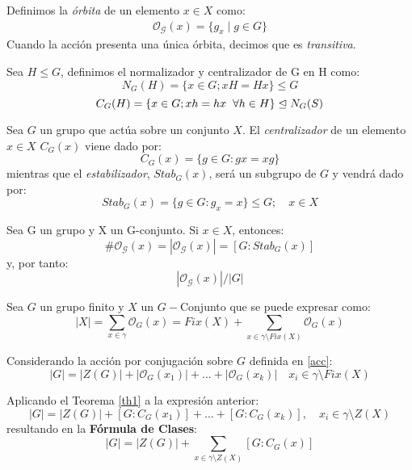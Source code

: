 \iffalse
\begin{definition}
	 Definimos la \textit{órbita} de un elemento $x \in X$ como:
    \begin{align*}
    	\mathcal{O_G}(x) = \{g_x \; | \; g\in G\} 
    \end{align*}
    Cuando la acción presenta una única órbita, decimos que es \textit{transitiva}.
\end{definition}



\begin{definition}
    Sea $H\leq G$, definimos el normalizador y centralizador de G en H como:
    \[
    N_G(H)= \{ x \in G; xH=Hx \} \leq G
    \]
    \[
    C_G(H) = \{ x \in G; xh=hx \hspace{0.2cm}\forall h \in H \} \trianglelefteq N_G(S)
    \]
\end{definition}




\begin{definition}
    Sea $G$ un grupo que actúa sobre un conjunto $X$.
    El \textit{centralizador} de un elemento $x\in X$ $C_G(x)$ viene dado por:
    \[
    C_G(x) = \{ g \in G : gx=xg \}
    \]
    mientras que el \textit{estabilizador}, $Stab_G(x)$, será un subgrupo de $G$ y vendrá dado por:
	\[
	    Stab_G(x) = \{ g \in G : g_x=x \} \leq G ;\quad x\in X
	\]
\end{definition}





\begin{theorem} \label{th1}
Sea G un grupo y X un G-conjunto. Si $x\in X$, entonces:
\[
    \text{\#}\mathcal{O_G}(x) = |\mathcal{O_G}(x)| = [G:Stab_G(x)]  
\]
y, por tanto:
\[
    |\mathcal{O_G}(x)| \big/ |G|
\]

\end{theorem}



\begin{definition}
Sea $G$ un grupo finito y $X$ un $G-$Conjunto que se puede expresar como:
\[
|X| = \sum_{x \in \gamma} {\mathcal{O}_G(x)} = Fix(X) + \sum_{x \in \gamma \setminus Fix(X)} {\mathcal{O}_G(x)}
\]


Considerando la acción por conjugación sobre $G$ definida en \ref{acc}:
\[
    |G| = |Z(G)| + |\mathcal{O}_G(x_1)| +...+ |\mathcal{O}_G(x_k)| \quad x_i \in \gamma \setminus Fix(X)
\]

Aplicando el Teorema \ref{th1} a la expresión anterior:
\[
    |G| = |Z(G)| + [ G:C_G(x_1)] +...+ [ G:C_G(x_k)] , \quad x_i \in \gamma \setminus Z(X)
\]
resultando en la \textbf{Fórmula de Clases}:
\[
    |G| = |Z(G)| + \sum_{x \in \gamma \setminus Z(X)}{ [ G:C_G(x)]} 
\]


\end{definition}

